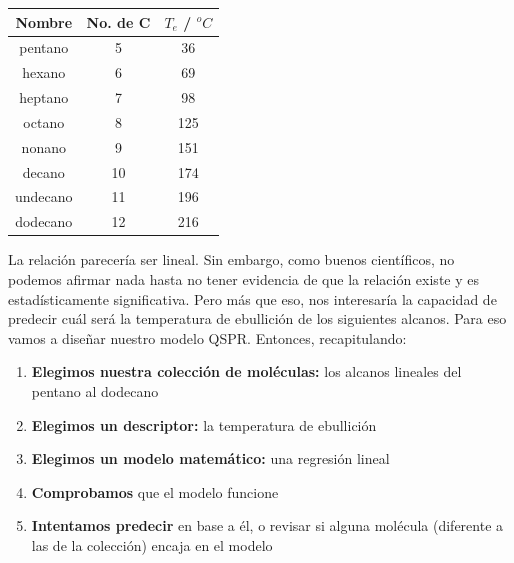 \documentclass[10pt,letterpaper]{article}
\begin{document}
\begin{center}
\begin{tabular}{ccc}
\hline
\textbf{Nombre} & \textbf{No. de C} & \textbf{$T_{e}$ / $^o C$}\\
\hline
pentano & 5 & 36\\
hexano & 6 & 69\\
heptano & 7 & 98\\
octano & 8 & 125\\
nonano & 9 & 151\\
decano & 10 & 174\\
undecano & 11 & 196\\
dodecano & 12 & 216\\
\hline
\end{tabular}
\end{center}

La relaci\'on parecer\'ia ser lineal. Sin embargo, como buenos cient\'ificos, no podemos afirmar nada hasta no tener evidencia de que la relaci\'on existe y es estad\'isticamente significativa. Pero m\'as que eso, nos interesar\'ia la capacidad de predecir cu\'al ser\'a la temperatura de ebullici\'on de los siguientes alcanos. Para eso vamos a dise\~nar nuestro modelo QSPR. Entonces, recapitulando:

\begin{enumerate}
\item \textbf{Elegimos nuestra colecci\'on de mol\'eculas:} los alcanos lineales del pentano al dodecano
\item \textbf{Elegimos un descriptor:} la temperatura de ebullici\'on
\item \textbf{Elegimos un modelo matem\'atico:} una regresi\'on lineal
\item \textbf{Comprobamos} que el modelo funcione
\item \textbf{Intentamos predecir} en base a \'el, o revisar si alguna mol\'ecula (diferente a las de la colecci\'on) encaja en el modelo
\end{enumerate}
\end{document}
